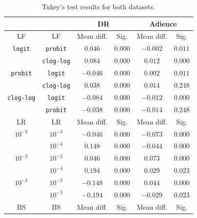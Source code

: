 \documentclass[preprint]{elsarticle}
\begin{document}
\begin{table}[!t]
	\caption{Tukey's test results for both datasets.}
	\label{table:Tukey}
	\centering
	\footnotesize
	\begin{tabular}{cccccc}
		\hline\hline
		&                   & \multicolumn{2}{c}{\textbf{DR}} & \multicolumn{2}{c}{\textbf{Adience}} \\ \hline
		LF         &        LF         & Mean diff. &        Sig.        & Mean diff. &          Sig.           \\ \hline
		\texttt{logit}   &  \texttt{probit}  &  $0.046$   &      $0.000$       &  $-0.002$  &         $0.011$         \\
		& \texttt{clog-log} &  $0.084$   &      $0.000$       &  $0.012$   &         $0.000$         \\
		\texttt{probit}  &  \texttt{logit}   &  $-0.046$  &      $0.000$       &  $0.002$   &         $0.011$         \\
		& \texttt{clog-log} &  $0.038$   &      $0.000$       &  $0.014$   &         $0.248$         \\
		\texttt{clog-log} &  \texttt{logit}   &  $-0.084$  &      $0.000$       &  $-0.012$  &         $0.000$         \\
		&  \texttt{probit}  &  $-0.038$  &      $0.000$       &  $-0.014$  &         $0.248$         \\ \hline\hline
		LR         &        LR         & Mean diff. &        Sig.        & Mean diff. &          Sig.           \\ \hline
		$10^{-2}$     &     $10^{-3}$     &  $-0.046$  &      $0.000$       &  $-0.073$  &         $0.000$         \\
		&     $10^{-4}$     &  $0.148$   &      $0.000$       &  $-0.044$  &         $0.000$         \\
		$10^{-3}$     &     $10^{-2}$     &  $0.046$   &      $0.000$       &  $0.073$   &         $0.000$         \\
		&     $10^{-4}$     &  $0.194$   &      $0.000$       &  $0.029$   &         $0.023$         \\
		$10^{-4}$     &     $10^{-2}$     &  $-0.148$  &      $0.000$       &  $0.044$   &         $0.000$         \\
		&     $10^{-3}$     &  $-0.194$  &      $0.000$       &  $-0.029$  &         $0.023$         \\ \hline\hline
		BS         &        BS         & Mean diff. &        Sig.        & Mean diff. &          Sig.           \\ \hline

\end{tabular}
\end{table}
\end{document}
